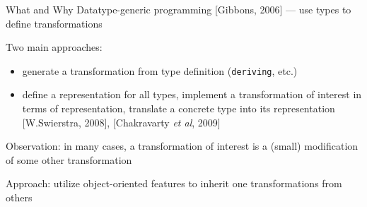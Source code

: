 \documentclass{beamer}
\theoremstyle{definition}
\theoremstyle{plain} %
\begin{document}
\begin{frame}[fragile]{What and Why}
  Datatype-generic programming [Gibbons, 2006] --- use types to define transformations  
  \vskip5mm
  
  Two main approaches:

  \begin{itemize}
    \item generate a transformation from type definition (\lstinline[basicstyle=\large]|deriving|, etc.)
    \item define a representation for all types, implement a transformation of interest in terms of representation, translate a concrete
      type into its representation [W.Swierstra, 2008], [Chakravarty \emph{et al}, 2009]
  \end{itemize}
  \vskip5mm
  
  Observation: in many cases, a transformation of interest is a (small) modification of some other transformation
  \vskip5mm
  
  Approach: utilize object-oriented features to inherit one transformations from others
\end{frame}



\begin{comment}
  In our work we borrow some terminology and a meta-approach from the area of attribute grammars. Attribute grammars were
  introduced by Knuth as a mean to express a class of syntax-directed transformations, for which regular context-free
  grammars were not powerful or convenient enough. The similarity between attribute evaluation procedures and datatype-generic
  transformations was addressed multiple times. However, we do not make use of concrete algorithms for various classes of
  attribute grammars; we just consider AG terminology and approach very generic and convenient.

  We deal only with the transformations of types $\iota \to t \to \sigma$, where $\iota$ is a type for inherited attribute,
  $t$~--- a type for transforming data structure, and $\sigma$~--- a type for synthesized attribute. Informally speaking,
  synthesized attribute is the result of a transformation, while inherited~--- some auxiliary value, which may turn out
  to be useful is some specific cases. For parametric types this signature is enriched with similar transformations for
  type parameters. Note, both inherited and synthesized attributes for the transformations of type parameters can
  be different from each other and from those for the main type.

  This is a very generic scheme of transformations. All transformations, expressible in our framework, are
  instances of this scheme, and if a transformation does not fit into it, it cannot be implemented.  
\end{comment}
\end{document}
